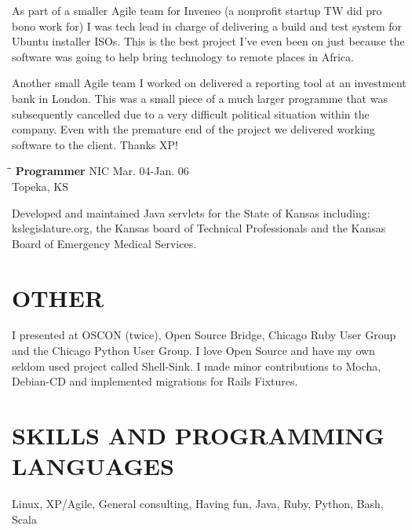 \documentclass{res}
\begin{document}
\begin{resume}
    As part of a smaller Agile team for Inveneo (a nonprofit startup TW
    did pro bono work for) I was tech lead in charge of delivering 
    a build and test system for Ubuntu installer ISOs. This is the
    best project I've even been on just because the software was
    going to help bring technology to remote places in Africa.

    Another small Agile team I worked on delivered a reporting tool
    at an investment bank in London.  This was a small piece of a 
    much larger programme that was subsequently cancelled due to 
    a very difficult political situation within the company.  Even
    with the premature end of the project we delivered working software
    to the client.  Thanks XP! %

   \begin{tabbing}
   \hspace{2.3in}\= \hspace{2.6in}\= \kill %
    {\bf Programmer} \>NIC \> Mar. 04-Jan. 06\\
                          \>Topeka, KS
   \end{tabbing}\vspace{-20pt}
    Developed and maintained Java servlets for the State of Kansas
    including: kslegislature.org, the Kansas board of Technical 
    Professionals and the Kansas Board of Emergency Medical Services.

\section{OTHER}          
    I presented at OSCON (twice), Open Source Bridge, Chicago Ruby 
    User Group and the Chicago Python User Group.  I love Open 
    Source and have my own seldom used project called Shell-Sink.  
    I made minor contributions to Mocha, Debian-CD and implemented 
    migrations for Rails Fixtures.

\section{SKILLS AND PROGRAMMING LANGUAGES}          
    Linux, XP/Agile, General consulting, Having fun, Java, Ruby, 
    Python, Bash, Scala\\
     

\end{resume}
\end{document}
